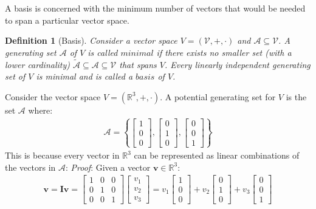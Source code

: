 \documentclass[a4paper,12pt]{article}
\newcommand{\set}[1]{\mathcal{#1}}
\newcommand{\matrx}[1]{\bm{#1}}
\newcommand{\vectr}[1]{\textbf{#1}}
\newcommand{\real}{\mathbb{R}}
\newcommand{\italic}[1]{\textit{#1}}
\newtheorem{definition}{Definition}[section]
\begin{document}
	A basis is concerned with the minimum number of vectors that would be needed to span a particular vector space. 
	\begin{definition}[Basis] \cite{def_basis}
		\normalfont Consider a vector space $\italic{V} = (\set{V}, +, \cdot)$ and $\set{A} \subseteq \set{V}$. A generating set $\set{A}$ of $\italic{V}$ is called $\italic{minimal}$ if there exists no smaller set (with a lower cardinality) $\set{\tilde{A}} \subseteq \set{A} \subseteq \set{V}$ that spans $\italic{V}$. Every linearly independent generating set of $\italic{V}$  is minimal and is called a $\italic{basis}$ of $\italic{V}$.
		\label{def:basis}
	\end{definition}
	Consider the vector space $ \italic{V} = (\real^{3}, +, \cdot) $. A potential generating set for $ \italic{V} $ is the set $ \set{A} $ where:
	\begin{align}
		\set{A} = \left\{\begin{bmatrix} 1 \\ 0 \\ 0  \end{bmatrix},\begin{bmatrix} 0 \\ 1 \\ 0 \end{bmatrix},\begin{bmatrix} 0 \\ 0 \\ 1 \end{bmatrix} \right\}
	\end{align}
	This is because every vector in $ \real^{3} $ can be represented as linear combinations of the vectors in $ \set{A} $:
	\italic{Proof}: Given a vector $ \vectr{v} \in \real^{3} $:
	\begin{align}
		\vectr{v} = \matrx{I}\vectr{v} = \begin{bmatrix}
			1 & 0 & 0 \\
			0 & 1 & 0 \\
			0 & 0 & 1 
		\end{bmatrix} \begin{bmatrix}
			v_1 \\
			v_2 \\
			v_3
		\end{bmatrix} = v_1 \begin{bmatrix}
			1 \\ 0 \\ 0
		\end{bmatrix} + v_2 \begin{bmatrix}
			0 \\ 1 \\ 0 
		\end{bmatrix} + v_3 \begin{bmatrix}
			0 \\ 0 \\ 1
		\end{bmatrix}
	\end{align}
	
\end{document}
